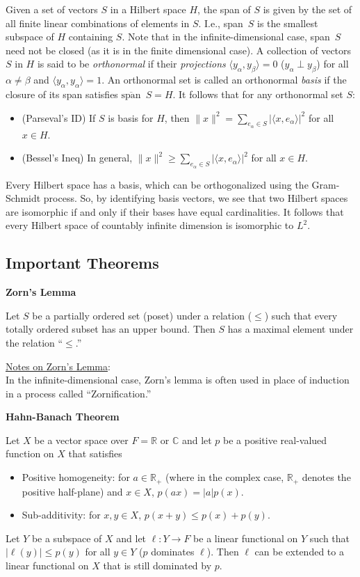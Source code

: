 \documentclass[12pt]{article}
\begin{document}
Given a set of vectors $S$ in a Hilbert space $H$, the span of $S$ is
given by the set of all finite linear combinations of elements in $S$.
I.e., span~$S$ is the smallest subspace of $H$ containing $S$.
Note that in the infinite-dimensional case, span~$S$ need not be
closed (as it is in the finite dimensional case).
A collection of vectors $S$ in $H$ is said to be {\it orthonormal}
if their {\it projections} $\langle y_\alpha, y_\beta\rangle = 0$
($y_\alpha \perp y_\beta$)
for all $\alpha\neq\beta$ and $\langle y_\alpha, y_\alpha\rangle =1$.
An orthonormal set is called an orthonormal {\it basis} if the 
closure of its span satisfies $\overline{\text{span}}$~$S=H$.
It follows that for any orthonormal set $S$:
\begin{itemize}
	\item (Parseval's ID) If $S$ is basis for $H$, then 
		$\|x\|^2=\sum_{e_\alpha\in S}|\langle x,e_\alpha\rangle|^2$
		for all $x\in H$.
	\item (Bessel's Ineq) In general, 
		$\|x\|^2\geq\sum_{e_\alpha\in S}|\langle x,e_\alpha\rangle|^2$
		for all $x\in H$.
\end{itemize}
Every Hilbert space has a basis, which can be orthogonalized
using the Gram-Schmidt process. So, by identifying basis vectors,
we see that two Hilbert spaces are isomorphic if and only if their
bases have equal cardinalities. It follows that every Hilbert space
of countably infinite dimension is isomorphic to $L^2$.

\subsection*{Important Theorems}

{\bf Zorn's Lemma}

Let $S$ be a partially ordered set (poset) under a relation ($\leq$)
such that every totally ordered subset has an upper bound. Then $S$
has a maximal element under the relation ``$\leq$.''

\underline{Notes on Zorn's Lemma}:\\
In the infinite-dimensional case, Zorn's lemma is often used in place
of induction in a process called ``Zornification.''
\bigskip

{\bf Hahn-Banach Theorem}

Let $X$ be a vector space over $F = \mathbb{R}$ or $\mathbb{C}$ and
let $p$ be a positive real-valued function on $X$ that
satisfies
\begin{itemize}
	\item Positive homogeneity: for $a\in\mathbb{R}_+$ (where in the
		complex case, $\mathbb{R}_+$ denotes the positive half-plane)
		and $x\in X$, $p(ax) = |a| p(x)$.
	\item Sub-additivity: for $x,y\in X$, $p(x+y) \leq p(x) + p(y)$.
\end{itemize} 
Let $Y$ be a subspace of $X$ and let $\ell : Y \rightarrow F$ be a linear
functional on $Y$ such that $|\ell(y)| \leq p(y)$ for all $y\in Y$
($p$ dominates $\ell$).
Then $\ell$ can be extended to a linear functional on $X$ that is still
dominated by $p$.
\bigskip
\end{document}
